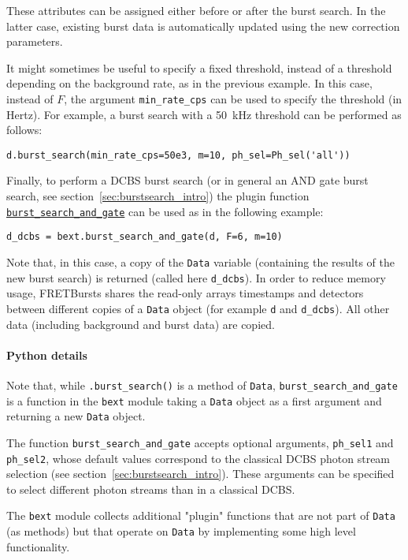These attributes can be assigned either before or after the burst search. In the
latter case, existing burst data is automatically updated using the new
correction parameters.

It might sometimes be useful to specify a fixed threshold, instead
of a threshold depending on the background rate, as in the previous example. In
this case, instead of $F$, the argument \verb|min_rate_cps| can be used to
specify the threshold (in Hertz). For example, a burst search with a 50~kHz
threshold can be performed as follows:

\begin{verbatim}
d.burst_search(min_rate_cps=50e3, m=10, ph_sel=Ph_sel('all'))
\end{verbatim}

Finally, to perform a DCBS burst search (or in general an AND gate burst search,
see section~\ref{sec:burstsearch_intro}) the plugin function
\href{http://fretbursts.readthedocs.org/en/latest/plugins.html#fretbursts.burstlib\_ext.burst\_search\_and\_gate}{\texttt{burst\_search\_and\_gate}}
can be used as in the following example:

\begin{verbatim}
d_dcbs = bext.burst_search_and_gate(d, F=6, m=10)
\end{verbatim}

Note that, in this case, a copy of the \verb|Data| variable (containing the results
of the new burst search) is returned (called here \verb|d_dcbs|).
In order to
reduce memory usage, FRETBursts shares the read-only arrays timestamps and detectors between
different copies of a \verb|Data| object (for example \verb|d| and
\verb|d_dcbs|).
All other data (including background and burst data) are copied.


\paragraph{Python details}
Note that, while \verb|.burst_search()| is a method of \verb|Data|,
\verb|burst_search_and_gate| is a function in the \verb|bext| module
taking a \verb|Data| object as a first argument and returning a new
\verb|Data| object.

The function \verb|burst_search_and_gate| accepts optional arguments,
\verb|ph_sel1| and \verb|ph_sel2|, whose default values correspond to the
classical DCBS photon stream selection (see section~\ref{sec:burstsearch_intro}).
These arguments can be specified to select different photon streams than in
a classical DCBS.

The \verb|bext| module collects additional "plugin" functions
that are not part of \verb|Data| (as methods) but that operate
on \verb|Data| by implementing some high level functionality.

